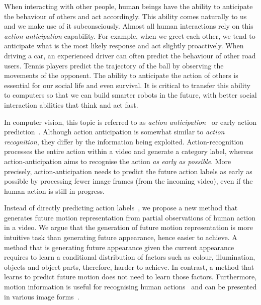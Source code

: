 When interacting with other people, human beings have the ability to anticipate the behaviour of others and act accordingly. This ability comes naturally to us and we make use of it subconsciously. Almost all human interactions rely on this {\em action-anticipation} capability. For example, when we greet each other, we tend to anticipate what is the most likely response and act slightly proactively. When driving a car, an experienced driver can often predict the behaviour of other road users. Tennis players predict the trajectory of the ball by observing the movements of the opponent. The ability to anticipate the action of others is essential for our social life and even survival. It is critical to transfer this ability to computers so that we can build smarter robots in the future, with better social interaction abilities that think and act fast.

In computer vision, this topic is referred to as {\em action anticipation}~\cite{ma2016learning,ryoo2011human,aliakbarian2017encouraging,soomro2016online,soomro2016predicting} or early action prediction~\cite{lan2014hierarchical,yu2012predicting}. 
Although action anticipation is somewhat similar to {\em action recognition}, they differ by the information being exploited.  Action-recognition processes the entire action within a video and generate a category label, whereas action-anticipation aims to recognise the action {\em as early as possible}.  More precisely, action-anticipation needs to predict the future action labels as early as possible by processing fewer image frames (from the incoming video), even if the human action is still in progress. 

Instead of directly predicting action labels~\cite{aliakbarian2017encouraging}, we propose a new method that generates future motion representation from partial observations of human action in a video. We argue that the generation of future motion representation is more intuitive task than generating future appearance, hence easier to achieve. A method that is generating future appearance given the current appearance requires to learn a conditional distribution of factors such as colour, illumination, objects and object parts, therefore, harder to achieve.  In contrast, a method that learns to predict future motion does not need to learn those factors.  Furthermore, motion information is useful for recognising human actions~\cite{Bilen2017,Simonyan2014} and can be presented in various image forms~\cite{Bilen2017,Ahad2012}.

